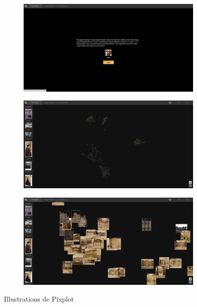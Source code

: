 \begin{figure}[H]
    \centering
    \begin{subfigure}{0.8\textwidth}
        \includegraphics[width=\linewidth]{Illustrations/Pixplot1.png}
        \caption{}
    \end{subfigure}
    \begin{subfigure}{0.8\textwidth}
        \includegraphics[width=\linewidth]{Illustrations/Pixplot2.png}
        \caption{}
    \end{subfigure}
    \begin{subfigure}{0.8\textwidth}
        \includegraphics[width=\linewidth]{Illustrations/Pixplot3.png}
        \caption{}
    \end{subfigure}
    \caption{Illustrations de Pixplot}
    \label{fig:pellicules}
\end{figure}

